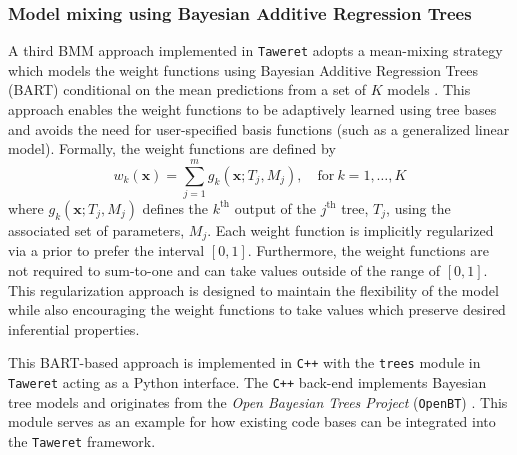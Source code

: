 \documentclass[10pt, preprint,aps,prc,floatfix,
tightenlines,
nofootinbib,superscriptaddress]{revtex4-2}
\newcommand{\xvec}{\boldsymbol x}
\begin{document}
\subsubsection{Model mixing using Bayesian Additive Regression Trees}
    
A third BMM approach implemented in \texttt{Taweret} adopts a mean-mixing strategy which models the weight functions using Bayesian Additive Regression Trees (BART) conditional on the mean predictions from a set of $K$ models \cite{yannotty2023model}. This approach enables the weight functions to be adaptively learned using tree bases and avoids the need for user-specified basis functions (such as a generalized linear model). Formally, the weight functions are defined by 
\begin{equation}
    w_k(\xvec) = \sum_{j = 1}^m g_k(\xvec; T_j, M_j), \quad \text{for}\ k=1,\ldots,K
\end{equation}
where $g_k(\xvec;T_j,M_j)$ defines the $k^\text{th}$ output of the $j^\text{th}$ tree, $T_j$, using the associated set of parameters, $M_j$. Each weight function is implicitly regularized via a prior to prefer the interval $[0,1]$. Furthermore, the weight functions are not required to sum-to-one and can take values outside of the range of $[0,1]$. This regularization approach is designed to maintain the flexibility of the model while also encouraging the weight functions to take values which preserve desired inferential properties.

This BART-based approach is implemented in \texttt{C++} with the \texttt{trees} module in \texttt{Taweret} acting as a Python interface. The \texttt{C++} back-end implements Bayesian tree models and originates from the \textit{Open Bayesian Trees Project} (\texttt{OpenBT}) \cite{OpenBT_MTP}. This module serves as an example for how existing code bases can be integrated into the \texttt{Taweret} framework.           
\end{document}
